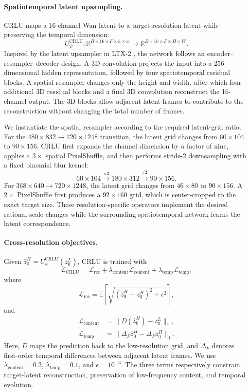 \paragraph{Spatiotemporal latent upsampling.}
CRLU maps a 16-channel Wan latent to a target-resolution latent while
preserving the temporal dimension:
\[
U_\psi^{\mathrm{CRLU}}:
\mathbb R^{B\times16\times F\times h\times w}
\rightarrow
\mathbb R^{B\times16\times F\times H\times W}.
\]
Inspired by the latent upsampler in LTX-2
\citep{hacohen2026ltx2}, the network follows an
encoder--resampler--decoder design. A 3D convolution projects the input
into a 256-dimensional hidden representation, followed by four
spatiotemporal residual blocks. A spatial resampler changes only the
height and width, after which four additional 3D residual blocks and a
final 3D convolution reconstruct the 16-channel output. The 3D blocks
allow adjacent latent frames to contribute to the reconstruction without
changing the total number of frames.

We instantiate the spatial resampler according to the required latent-grid
ratio. For the \(480\times832\rightarrow720\times1248\) transition, the
latent grid changes from \(60\times104\) to \(90\times156\). CRLU first
expands the channel dimension by a factor of nine, applies a \(3\times\)
spatial PixelShuffle, and then performs stride-2 downsampling with a fixed
binomial blur kernel:
\[
60\times104
\xrightarrow{\times3}
180\times312
\xrightarrow{/2}
90\times156.
\]
For \(368\times640\rightarrow720\times1248\), the latent grid changes
from \(46\times80\) to \(90\times156\). A \(2\times\) PixelShuffle first
produces a \(92\times160\) grid, which is center-cropped to the exact
target size. These resolution-specific operators implement the desired
rational scale changes while the surrounding spatiotemporal network
learns the latent correspondence.

\paragraph{Cross-resolution objectives.}
Given
\(\widehat z_0^H=U_\psi^{\mathrm{CRLU}}(z_0^L)\), CRLU is trained with
\[
\mathcal L_{\mathrm{CRLU}}
=
\mathcal L_{\mathrm{rec}}
+\lambda_{\mathrm{content}}\mathcal L_{\mathrm{content}}
+\lambda_{\mathrm{temp}}\mathcal L_{\mathrm{temp}},
\]
where
\[
\mathcal L_{\mathrm{rec}}
=
\mathbb E\!\left[
\sqrt{(\widehat z_0^H-z_0^H)^2+\epsilon^2}
\right],
\]
and
\begin{align}
\mathcal L_{\mathrm{content}}
&=\lVert D(\widehat z_0^H)-z_0^L\rVert_1,\\
\mathcal L_{\mathrm{temp}}
&=\lVert\Delta_F\widehat z_0^H-\Delta_Fz_0^H\rVert_1.
\end{align}
Here, \(D\) maps the prediction back to the low-resolution grid, and
\(\Delta_F\) denotes first-order temporal differences between adjacent
latent frames. We use
\(\lambda_{\mathrm{content}}=0.2\),
\(\lambda_{\mathrm{temp}}=0.1\), and \(\epsilon=10^{-3}\). The three
terms respectively constrain target-latent reconstruction, preservation
of low-frequency content, and temporal evolution.

